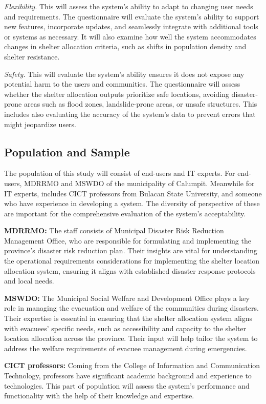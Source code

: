 	\textit{Flexibility.} This will assess the system’s ability to adapt to changing user needs and requirements. The questionnaire will evaluate the system's ability to support new features, incorporate updates, and seamlessly integrate with additional tools or systems as necessary. It will also examine how well the system accommodates changes in shelter allocation criteria, such as shifts in population density and shelter resistance.
	
	\textit{Safety.} This will evaluate the system's ability ensures it does not expose any potential harm to the users and communities. The questionnaire will assess whether the shelter allocation outputs prioritize safe locations, avoiding disaster-prone areas such as flood zones, landslide-prone areas, or unsafe structures. This includes also evaluating the accuracy of the system's data to prevent errors that might jeopardize users.

\subsection{Population and Sample}
	The population of this study will consist of end-users and IT experts. For end-users,  MDRRMO and MSWDO of the municipality of Calumpit. Meanwhile for IT experts, includes CICT professors from Bulacan State University, and someone who have experience in developing a system.  The diversity of perspective of these are important for the comprehensive evaluation of the system’s acceptability.
	
	\textbf{MDRRMO:} The staff consists of Municipal Disaster Risk Reduction Management Office, who are responsible for formulating and implementing the province's disaster risk reduction plan.  Their insights are vital for understanding the operational requirements considerations for implementing the shelter location allocation system, ensuring it aligns with established disaster response protocols and local needs.
	
	\textbf{MSWDO:} The Municipal Social Welfare and Development Office plays a key role in managing the evacuation and welfare of the communities during disasters. Their expertise is essential in ensuring that the shelter allocation system aligns with evacuees' specific needs, such as accessibility and capacity to the shelter location allocation across the province. Their input will help tailor the system to address the welfare requirements of evacuee management during emergencies.
	
	\textbf{CICT professors:} Coming from the College of Information and Communication Technology, professors have significant academic background and experience to technologies. This part of population will assess the system's performance and functionality with the help of their knowledge and expertise.
	
